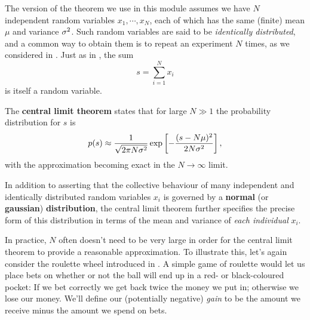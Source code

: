 The version of the theorem we use in this module assumes we have $N$ independent random variables $x_1, \cdots, x_N$, each of which has the same (finite) mean $\mu$ and variance $\sigma^2$.
Such random variables are said to be \textit{identically distributed}, and a common way to obtain them is to repeat an experiment $N$ times, as we considered in .
Just as in , the sum
\begin{equation}
  \label{eq:CLTsum}
  s = \sum_{i = 1}^N x_i
\end{equation}
is itself a random variable.

\begin{shaded}
  The \textbf{central limit theorem} states that for large $N \gg 1$ the probability distribution for $s$ is
  \begin{equation}
    \label{eq:CLT}
    p(s) \approx \frac{1}{\sqrt{2\pi N\sigma^2}} \exp\left[-\frac{(s - N\mu)^2}{2N\sigma^2}\right],
  \end{equation}
  with the approximation becoming exact in the $N \to \infty$ limit.
\end{shaded}
In addition to asserting that the collective behaviour of many independent and identically distributed random variables $x_i$ is governed by a \textbf{normal} (or \textbf{gaussian}) \textbf{distribution}, the central limit theorem further specifies the precise form of this distribution in terms of the mean and variance of \textit{each individual} $x_i$. %

In practice, $N$ often doesn't need to be very large in order for the central limit theorem to provide a reasonable approximation.
To illustrate this, let's again consider the roulette wheel introduced in .
A simple game of roulette would let us place bets on whether or not the ball will end up in a red- or black-coloured pocket: If we bet correctly we get back twice the money we put in; otherwise we lose our money.
We'll define our (potentially negative) \textit{gain} to be the amount we receive minus the amount we spend on bets.

